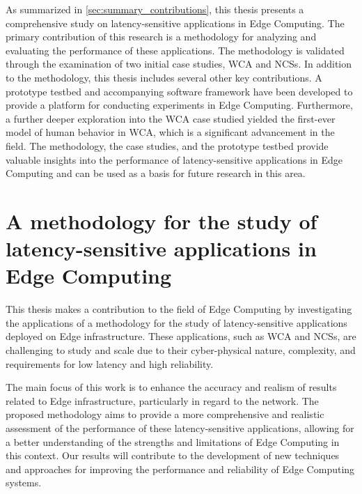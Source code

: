 As summarized in \cref{sec:summary_contributions}, this thesis presents a comprehensive study on latency-sensitive applications in Edge Computing.
The primary contribution of this research is a methodology for analyzing and evaluating the performance of these applications.
The methodology is validated through the examination of two initial case studies, \gls{WCA} and \glspl{NCS}.
In addition to the methodology, this thesis includes several other key contributions.
A prototype testbed and accompanying software framework have been developed to provide a platform for conducting experiments in Edge Computing.
Furthermore, a further deeper exploration into the \gls{WCA} case studied yielded the first-ever model of human behavior in \gls{WCA}, which is a significant advancement in the field.
The methodology, the case studies, and the prototype testbed provide valuable insights into the performance of latency-sensitive applications in Edge Computing and can be used as a basis for future research in this area.

\section{A methodology for the study of latency-sensitive applications in Edge Computing}\label{summary:methodology}

This thesis makes a contribution to the field of Edge Computing by investigating the applications of a methodology for the study of latency-sensitive applications deployed on Edge infrastructure.
These applications, such as \gls{WCA} and \glspl{NCS}, are challenging to study and scale due to their cyber-physical nature, complexity, and requirements for low latency and high reliability.

The main focus of this work is to enhance the accuracy and realism of results related to Edge infrastructure, particularly in regard to the network.
The proposed methodology aims to provide a more comprehensive and realistic assessment of the performance of these latency-sensitive applications, allowing for a better understanding of the strengths and limitations of Edge Computing in this context.
Our results will contribute to the development of new techniques and approaches for improving the performance and reliability of Edge Computing systems.

